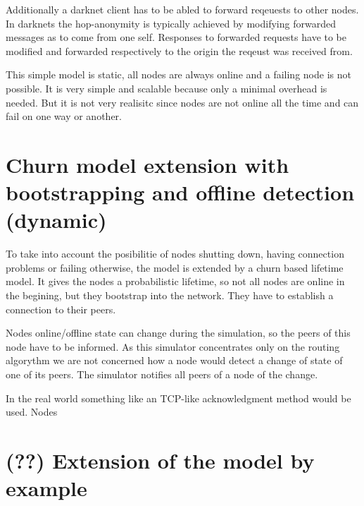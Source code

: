 Additionally a darknet client has to be abled to forward reqeuests to other nodes. In darknets the hop-anonymity is typically achieved by modifying forwarded messages as to come from one self. Responses to forwarded requests have to be modified and forwarded respectively to the origin the reqeust was received from.

This simple model is static, all nodes are always online and a failing node is not possible. It is very simple and scalable because only a minimal overhead is needed. But it is not very realisitc since nodes are not online all the time and can fail on one way or another.


\section{Churn model extension with bootstrapping and offline detection (dynamic)}

To take into account the posibilitie of nodes shutting down, having connection problems or failing otherwise, the model is extended by a churn based lifetime model. It gives the nodes a probabilistic lifetime, so not all nodes are online in the begining, but they bootstrap into the network. They have to establish a connection to their peers.

Nodes online/offline state can change during the simulation, so the peers of this node have to be informed. As this simulator concentrates only on the routing algorythm we are not concerned how a node would detect a change of state of one of its peers. The simulator notifies all peers of a node of the change. 

In the real world something like an TCP-like acknowledgment method would be used. Nodes 


\section{(??) Extension of the model by example}

